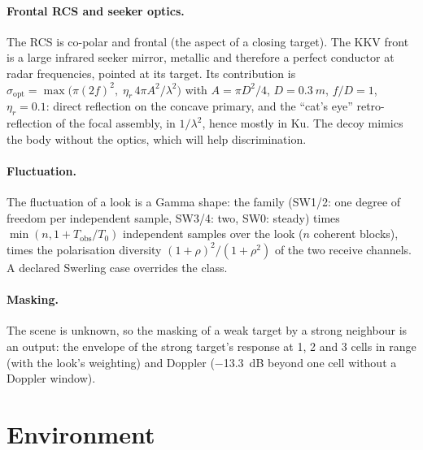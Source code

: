 \documentclass[11pt,a4paper]{article}
\begin{document}
\paragraph{Frontal RCS and seeker optics.} The RCS is co-polar and frontal (the aspect of a closing target). The KKV
front is a large infrared seeker mirror, metallic and therefore a perfect conductor at radar frequencies, pointed at
its target. Its contribution is
$\sigma_{\mathrm{opt}} = \max\bigl(\pi(2f)^2,\;\eta_r\,4\pi A^2/\lambda^2\bigr)$ with $A = \pi D^2/4$, $D = \SI{0.3}{m}$,
$f/D = 1$, $\eta_r = 0.1$: direct reflection on the concave primary, and the ``cat's eye'' retro-reflection of the
focal assembly, in $1/\lambda^2$, hence mostly in Ku. The decoy mimics the body without the optics, which will help
discrimination.

\paragraph{Fluctuation.} The fluctuation of a look is a Gamma shape: the family (SW1/2: one degree of freedom per
independent sample, SW3/4: two, SW0: steady) times $\min(n, 1 + T_{\mathrm{obs}}/T_0)$ independent samples over the
look ($n$ coherent blocks), times the polarisation diversity $(1+\rho)^2/(1+\rho^2)$ of the two receive channels.
A declared Swerling case overrides the class.

\paragraph{Masking.} The scene is unknown, so the masking of a weak target by a strong neighbour is an output: the
envelope of the strong target's response at 1, 2 and 3 cells in range (with the look's weighting) and Doppler
(\SI{-13.3}{dB} beyond one cell without a Doppler window).

\section{Environment}\label{sec:env}
\end{document}
